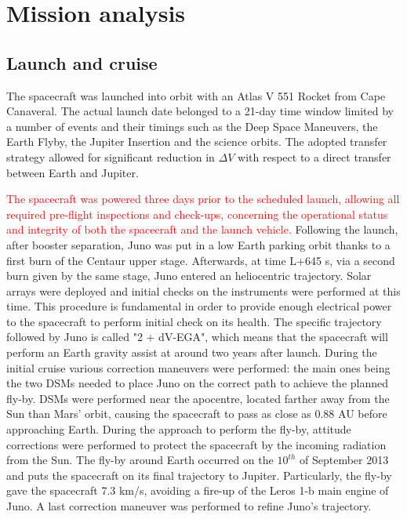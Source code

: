 \section{Mission analysis}
\label{sec:mission_analysis}

\subsection{Launch and cruise}
\label{sec: lancio e crociera}

The spacecraft was launched into orbit with an Atlas V 551 Rocket from Cape Canaveral. The actual launch date belonged to a 21-day time window limited by a number of events and their timings such as the Deep Space Maneuvers, the Earth Flyby, the Jupiter Insertion and the science orbits. The adopted transfer strategy allowed for significant reduction in $\Delta V$ with respect to a direct transfer between Earth and Jupiter.

\textcolor{red}{The spacecraft was powered three days prior to the scheduled launch, allowing all required pre-flight inspections and check-ups, concerning the operational status and integrity of both the spacecraft and the launch vehicle.}
Following the launch, after booster separation, Juno was put in a low Earth parking orbit thanks to a first burn of the Centaur upper stage. Afterwards, at time L+645 s, via a second burn given by the same stage, Juno entered an heliocentric trajectory. Solar arrays were deployed and initial checks on the instruments were performed at this time. This procedure is fundamental in order to provide enough electrical power to the spacecraft to perform initial check on its health. 
The specific trajectory followed by Juno is called "2 + dV-EGA", which means that the spacecraft will perform an Earth gravity assist at around two years after launch.
During the initial cruise various correction maneuvers were performed: the main ones being the two DSMs needed to place Juno on the correct path to achieve the planned fly-by. 
DSMs were performed near the apocentre, located farther away from the Sun than Mars' orbit, causing the spacecraft to pass as close as 0.88 AU before approaching Earth.  During the approach to perform the fly-by, attitude corrections were performed to protect the spacecraft by the incoming radiation from the Sun. 
The fly-by around Earth occurred on the $10^{th}$ of September 2013 and puts the spacecraft on its final trajectory to Jupiter. Particularly, the fly-by gave the spacecraft 7.3 km/s, avoiding a fire-up of the Leros 1-b main engine of Juno. A last correction maneuver was performed to refine Juno's trajectory. \cite{Overview_Juno} \cite{Juno_launch} \cite{batterie} \cite{spaceflight101} \cite{NASA_horizons}

